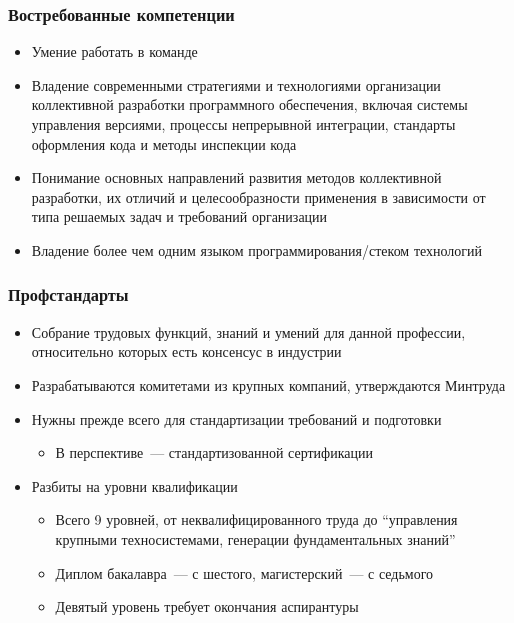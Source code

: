 \documentclass{../../slides-style}
\begin{document}
    \begin{frame}
        \frametitle{Востребованные компетенции}
        \begin{itemize}
            \item Умение работать в команде
            \item Владение современными стратегиями и технологиями организации коллективной разработки программного обеспечения, включая системы управления версиями, процессы непрерывной интеграции, стандарты оформления кода и методы инспекции кода
            \item Понимание основных направлений развития методов коллективной разработки, их отличий и целесообразности применения в зависимости от типа решаемых задач и требований организации
            \item Владение более чем одним языком программирования/стеком технологий
        \end{itemize}
    \end{frame}

    \begin{frame}
        \frametitle{Профстандарты}
        \begin{itemize}
            \item Собрание трудовых функций, знаний и умений для данной профессии, относительно которых есть консенсус в индустрии
            \item Разрабатываются комитетами из крупных компаний, утверждаются Минтруда
            \item Нужны прежде всего для стандартизации требований и подготовки
            \begin{itemize}
                \item В перспективе~--- стандартизованной сертификации
            \end{itemize}
            \item Разбиты на уровни квалификации
            \begin{itemize}
                \item Всего 9 уровней, от неквалифицированного труда до \enquote{управления крупными техносистемами, генерации фундаментальных знаний}
                \item Диплом бакалавра~--- с шестого, магистерский~--- с седьмого
                \item Девятый уровень требует окончания аспирантуры
            \end{itemize}
        \end{itemize}
    \end{frame}
\end{document}
